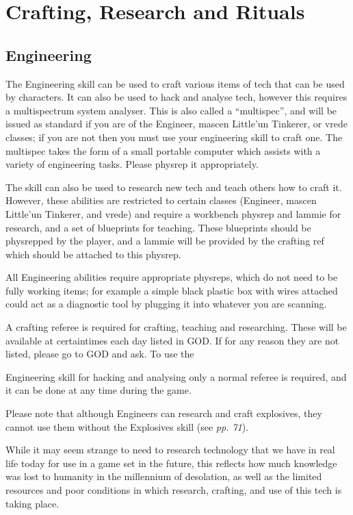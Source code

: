 \part{Crafting, Research and Rituals}

\chapter{Engineering}

The Engineering skill can be used to craft various items of tech that can be used by characters. It can also be used to hack and analyse tech, however this requires a multispectrum system analyser. This is also called a ``multispec'', and will be issued as standard if you are of the Engineer, mascen Little'un Tinkerer, or vrede classes; if you are not then you must use your engineering skill to craft one. The multispec takes the form of a small portable computer which assists with a variety of engineering tasks. Please physrep it appropriately.

The skill can also be used to research new tech and teach others how to craft it. However, these abilities are restricted to certain classes (Engineer, mascen Little'un Tinkerer, and vrede) and require a workbench physrep and lammie for research, and a set of blueprints for teaching. These blueprints should be physrepped by the player, and a lammie will be provided by the crafting ref which should be attached to this physrep.

All Engineering abilities require appropriate physreps, which do not need to be fully working items; for example a simple black plastic box with wires attached could act as a diagnostic tool by plugging it into whatever you are scanning.

A crafting referee is required for crafting, teaching and researching. These will be available at certaintimes each day listed in GOD. If for any reason they are not listed, please go to GOD and ask. To use the

Engineering skill for hacking and analysing only a normal referee is required, and it can be done at any time during the game.

Please note that although Engineers can research and craft explosives, they cannot use them without the Explosives skill (see \textit{pp. 71}).

While it may seem strange to need to research technology that we have in real life today for use in a game set in the future, this reflects how much knowledge was lost to humanity in the millennium of desolation, as well as the limited resources and poor conditions in which research, crafting, and use of this tech is taking place.

